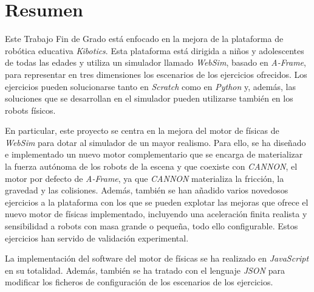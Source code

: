 \chapter*{Resumen}
Este Trabajo Fin de Grado está enfocado en la mejora de la plataforma de robótica educativa \textit{Kibotics}. Esta plataforma está dirigida a niños y adolescentes de todas las edades y utiliza un simulador llamado \textit{WebSim}, basado en \textit{A-Frame}, para representar en tres dimensiones los escenarios de los ejercicios ofrecidos. Los ejercicios pueden solucionarse tanto en \textit{Scratch} como en \textit{Python} y, además, las soluciones que se desarrollan en el simulador pueden utilizarse también en los robots físicos. \newline

En particular, este proyecto se centra en la mejora del motor de físicas de \textit{WebSim} para dotar al simulador de un mayor realismo. Para ello, se ha diseñado e implementado un nuevo motor complementario que se encarga de materializar la fuerza autónoma de los robots de la escena y que coexiste con \textit{CANNON}, el motor por defecto de \textit{A-Frame}, ya que \textit{CANNON} materializa la fricción, la gravedad y las colisiones. Además, también se han añadido varios novedosos ejercicios a la plataforma con los que se pueden explotar las mejoras que ofrece el nuevo motor de físicas implementado, incluyendo una aceleración finita realista y sensibilidad a robots con masa grande o pequeña, todo ello configurable. Estos ejercicios han servido de validación experimental.\newline

La implementación del software del motor de físicas se ha realizado en \textit{JavaScript} en su totalidad. Además, también se ha tratado con el lenguaje \textit{JSON} para modificar los ficheros de configuración de los escenarios de los ejercicios.